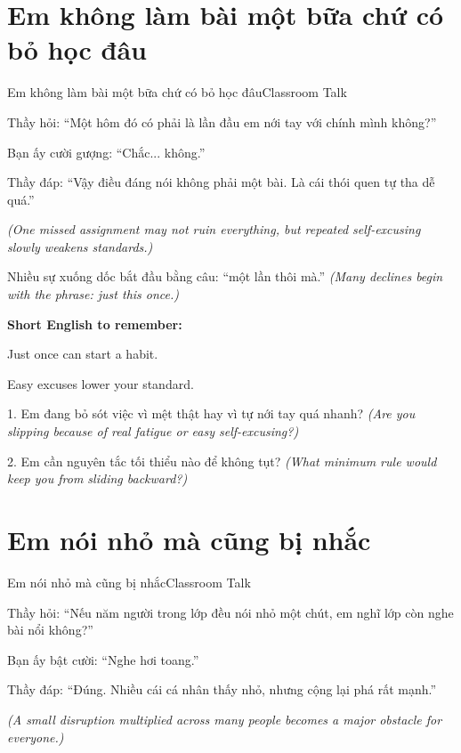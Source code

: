 \section{Em không làm bài một bữa chứ có bỏ học đâu}
\begin{truyen}{Em không làm bài một bữa chứ có bỏ học đâu}{Classroom Talk}

Thầy hỏi: ``Một hôm đó có phải là lần đầu em nới tay với chính mình không?''

Bạn ấy cười gượng: ``Chắc... không.''

Thầy đáp: ``Vậy điều đáng nói không phải một bài. Là cái thói quen tự tha dễ quá.''

\textit{(One missed assignment may not ruin everything, but repeated self-excusing slowly weakens standards.)}
\end{truyen}

\begin{baihoc}
Nhiều sự xuống dốc bắt đầu bằng câu: ``một lần thôi mà.''
\textit{(Many declines begin with the phrase: just this once.)}
\end{baihoc}

\begin{ghinhoanh}
\textbf{Short English to remember:}

Just once can start a habit.

Easy excuses lower your standard.
\end{ghinhoanh}

\begin{tuhocnhanh}
1. Em đang bỏ sót việc vì mệt thật hay vì tự nới tay quá nhanh? \textit{(Are you slipping because of real fatigue or easy self-excusing?)}

2. Em cần nguyên tắc tối thiểu nào để không tụt? \textit{(What minimum rule would keep you from sliding backward?)}
\end{tuhocnhanh}
\ngancach

\section{Em nói nhỏ mà cũng bị nhắc}
\begin{truyen}{Em nói nhỏ mà cũng bị nhắc}{Classroom Talk}

Thầy hỏi: ``Nếu năm người trong lớp đều nói nhỏ một chút, em nghĩ lớp còn nghe bài nổi không?''

Bạn ấy bật cười: ``Nghe hơi toang.''

Thầy đáp: ``Đúng. Nhiều cái cá nhân thấy nhỏ, nhưng cộng lại phá rất mạnh.''

\textit{(A small disruption multiplied across many people becomes a major obstacle for everyone.)}
\end{truyen}

